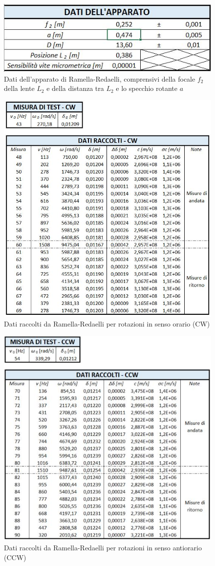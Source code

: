 \documentclass{article}
\begin{document}
\begin{figure}[h!]
    \centering
    \includegraphics[width=0.5\linewidth]{RAM_Apparato.JPG}
    \caption{Dati dell'apparato di Ramella-Redaelli, comprensivi della focale $f_2$ della lente $L_2$ e della distanza tra $L_2$ e lo specchio rotante $a$}
    \label{RAM_Apparato}
\end{figure}

\begin{figure}[h!]
    \centering
    \includegraphics[width=0.6\linewidth]{RAM_CW.JPG}
    \caption{Dati raccolti da Ramella-Redaelli per rotazioni in senso orario (CW)}
    \label{RAM_CW}
\end{figure}

\begin{figure}[h]
    \centering
    \includegraphics[width=0.6\linewidth]{RAM_CCW.JPG}
    \caption{Dati raccolti da Ramella-Redaelli per rotazioni in senso antiorario (CCW)}
    \label{RAM_CCW}
\end{figure}
\end{document}
